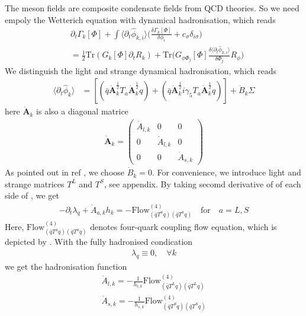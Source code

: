 \documentclass[%
reprint,
superscriptaddress,
showpacs,preprintnumbers,
amsmath,amssymb,
aps,
prd,
]{revtex4-1}
\def\fig#1{\Cref{#1}}
\def\Eq#1{\Cref{#1}}
\begin{document}
The meson fields are composite condensate fields from QCD theories. So we need empoly the Wetterich equation with dynamical hadronisation\cite{Fu:2019hdw}, which reads 
\begin{align}\label{Wettericheq}
&\partial_t \Gamma_k[\Phi]+\int \langle  \partial_t  \hat \phi_{k,i}\rangle \bigg ( \frac{\delta \Gamma_k [\Phi]}{\delta \phi_i}+c_\sigma \delta_{i \sigma}\bigg ) \\ \nonumber
&=\frac{1}{2} \text{Tr}(G_k[\Phi] \partial_t R_k)+\text{Tr}\bigg( G_{\phi \Phi_j} [\Phi] \frac{\delta \langle  \partial_t  \hat \phi_{k,i}\rangle}{\delta \Phi_j } R_{\phi} \bigg) 
\end{align}
We distinguish the light and strange dynamical hadronisation, which reads
\begin{align}
\langle  \partial_t  \hat \phi_{k}\rangle&= [(\bar q \dot{\pmb{A} }_{k}^{\frac{1}{2}} T_a  \dot{\pmb{A} }_{k}^{\frac{1}{2}}   q)+(\bar q \dot{\pmb{A} }_{k}^{\frac{1}{2}} i \gamma _5 T_a \dot{\pmb{A} }_{k}^{\frac{1}{2}} q)]+\dot{B}_k \Sigma
\end{align}
here $\dot{\pmb{A} }_{k}$ is also a diagonal matrice
\begin{align}
\dot{\pmb{A} }_{k}=\begin{pmatrix} 
\dot{A}_{l,k}&0&0\\
0&\dot{A}_{l,k}&0\\
0&0&\dot{A }_{s,k}
\end{pmatrix}
\end{align}
As pointed out in ref \cite{Braun:2014ata, Fu:2019hdw} , we choose $\dot{B}_k =0$.
For convenience, we introduce light and strange matrices $T^L$ and $T^S$, see appendix.
By taking secomd derivative of of each side of \Eq{Wettericheq}, we get
\begin{align}
- \partial_t \lambda_q + \dot{A}_{a,k} h_{k}=-\text{Flow} _{(\bar q T^a q) (\bar q T^a q)}^{(4)}
\quad \text{for} \quad a=L,S 
\end{align}
Here, $\text{Flow} _{(\bar q T^a q) (\bar q T^a q)}^{(4)}$ denotes four-quark coupling flow equation, which is depicted by \fig{fig:4quark}. With the fully hadronised condication
\begin{align}\label{lambda_eq}
\lambda_q  \equiv 0 , \quad \forall k
\end{align}
we get the hadronisation function
\begin{align}
\dot{A}_{l,k}=-\frac{1}{ h_{l,k}} \text{Flow}_{(\bar q T^L q) (\bar q T^L q)}^{(4)} \\
\dot{A}_{s,k}=-\frac{1}{ h_{s,k}}  \text{Flow}_{(\bar q T^S q) (\bar q T^S  q)}^{(4)}
\end{align}
\end{document}
